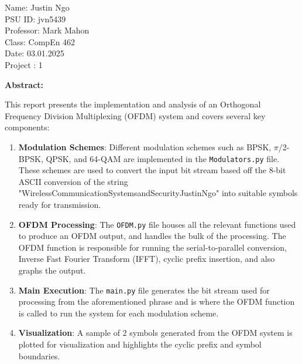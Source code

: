 \documentclass[letterpaper, 11pt]{article}
\def\class{CompEn 462}
\def\homeworkNumber{1}
\def\date{03.01.2025}
\def\professor{Mark Mahon}
\newcommand{\secHeader}[1]{\vspace{2mm} \noindent \textbf{#1:}\vspace{-4mm}}
\begin{document}
\hfill
\newline
Name: Justin Ngo
\\PSU ID: jvn5439
\\Professor: \professor
\\Class: \class
\\Date: \date
\\Project : \homeworkNumber

\newpage
\secHeader{Abstract}
\vspace{5mm}

This report presents the implementation and analysis of an Orthogonal Frequency Division Multiplexing (OFDM) system and 
covers several key components:

\begin{enumerate}
    \item \textbf{Modulation Schemes}: Different modulation schemes such as BPSK, $\pi$/2-BPSK, QPSK, and 64-QAM are implemented in the 
    \texttt{Modulators.py} file. These schemes are used to convert the input bit stream based off the 8-bit ASCII conversion of the string "WirelessCommunicationSystemsandSecurityJustinNgo"
    into suitable symbols ready for transmission.

    \item \textbf{OFDM Processing}: The \texttt{OFDM.py} file houses all the relevant functions used to produce an OFDM output, and handles the bulk of the processing.
    The OFDM function is responsible for running the serial-to-parallel conversion, Inverse Fast Fourier Transform (IFFT), cyclic prefix insertion, and also graphs the output.

    \item \textbf{Main Execution}: The \texttt{main.py} file generates the bit stream used for processing from the aforementioned phrase and is where the OFDM function is called 
    to run the system for each modulation scheme.

    \item \textbf{Visualization}: A sample of 2 symbols generated from the OFDM system is plotted for visualization and highlights the cyclic prefix and symbol boundaries. 
\end{enumerate}
\end{document}
